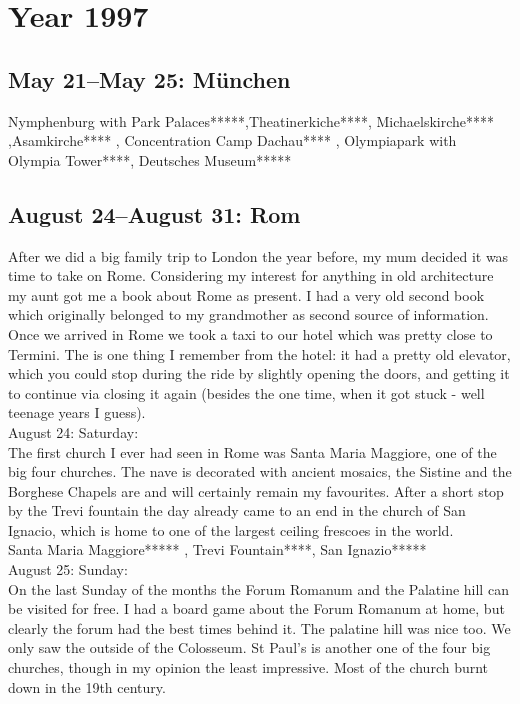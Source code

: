 \chapter{Year 1997}
\label{1997}

\section{May 21--May 25: M\"unchen}
\label{1997:Muenchen}


Nymphenburg with Park Palaces*****,Theatinerkiche****, Michaelskirche**** ,Asamkirche**** , Concentration Camp Dachau**** , Olympiapark with Olympia Tower****, Deutsches Museum*****

\section{August 24--August 31: Rom}
\label{1997:Rom}

After we did a big family trip to London the year before, my mum decided it was time to take on Rome. Considering my interest for anything in old architecture my aunt got me a book about Rome as present. I had a very old second book which originally belonged to my grandmother as second source of information. Once we arrived in Rome we took a taxi to our hotel which was pretty close to Termini. The is one thing I remember from the hotel: it had a pretty old elevator, which you could stop during the ride by slightly opening the doors, and getting it to continue via closing it again (besides the one time, when it got stuck - well teenage years I guess). \\

August 24: Saturday:\\
The first church I ever had seen in Rome was Santa Maria Maggiore, one of the big four churches. The nave is decorated with ancient mosaics, the Sistine and the Borghese Chapels are and will certainly remain my favourites. After a short stop by the Trevi fountain the day already came to an end in the church of San Ignacio, which is home to one of the largest ceiling frescoes in the world.\\

Santa Maria Maggiore***** , Trevi Fountain****, San Ignazio*****\\

August 25: Sunday:\\
On the last Sunday of the months the Forum Romanum and the Palatine hill can be visited for free. I had a board game about the Forum Romanum at home, but clearly the forum had the best times behind it. The palatine hill was nice too. We only saw the outside of the Colosseum. St Paul's is another one of the four big churches, though in my opinion the least impressive. Most of the church burnt down in the 19th century.\\


